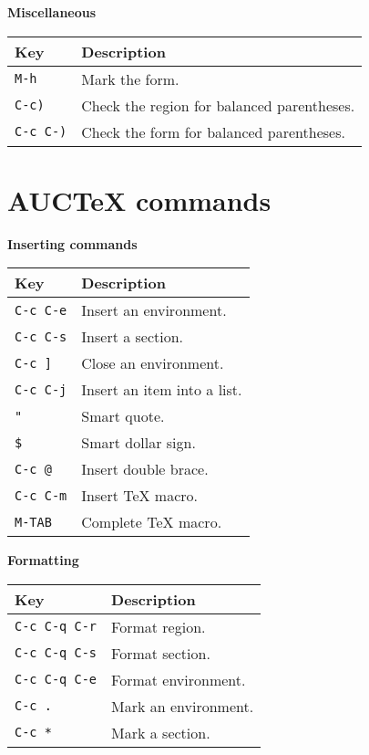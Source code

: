 \documentclass{article}
\begin{document}
\smallskip

\noindent
\textbf{Miscellaneous}

\smallskip

\noindent
\begin{tabular}{p{\firstcol}p{\secondcol}}
\hline
\textbf{Key} & \textbf{Description}\\
\hline
\texttt{M-h} & Mark the form.\\
\texttt{C-c)} & Check the region for balanced parentheses.\\
\texttt{C-c C-)} & Check the form for balanced parentheses.
\end{tabular}

\section{AUC\TeX{} commands}

\smallskip

\noindent
\textbf{Inserting commands}

\smallskip

\noindent
\begin{tabular}{p{\firstcol}p{\secondcol}}
\hline
\textbf{Key} & \textbf{Description}\\
\hline
\texttt{C-c C-e}
& Insert an environment.\\
\texttt{C-c C-s}
& Insert a section.\\
\texttt{C-c ]}
& Close an environment.\\
\texttt{C-c C-j}
& Insert an item into a list.\\
\texttt{"}
& Smart quote.\\
\texttt{\$}
& Smart dollar sign.\\
\texttt{C-c @}
& Insert double brace.\\
\texttt{C-c C-m}
& Insert \TeX{} macro.\\
\texttt{M-TAB}
& Complete \TeX{} macro.\\
\end{tabular}

\smallskip

\noindent
\textbf{Formatting}

\smallskip

\noindent
\begin{tabular}{p{\firstcol}p{\secondcol}}
\hline
\textbf{Key} & \textbf{Description}\\
\hline
\texttt{C-c C-q C-r}
& Format region.\\
\texttt{C-c C-q C-s}
& Format section.\\
\texttt{C-c C-q C-e}
& Format environment.\\
\texttt{C-c .}
& Mark an environment.\\
\texttt{C-c *}
& Mark a section.
\end{tabular}
\end{document}
